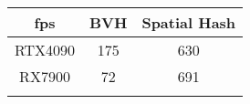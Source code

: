 \begin{tabular}{ccc}
    \toprule
    fps & BVH & Spatial Hash\\
    \midrule
    RTX4090 & 175 & 630 \\
    RX7900 & 72 & 691 \\
    \bottomrule
    \label{table:BVHvsSH}
\end{tabular}